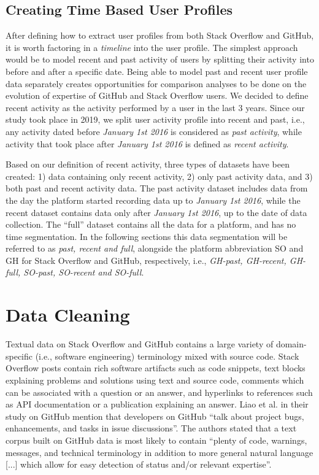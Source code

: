     \subsection{Creating Time Based User Profiles} \label{past_recent_full_segm}
        After defining how to extract user profiles from both Stack Overflow and GitHub, it is worth factoring in a \textit{timeline} into the user profile. The simplest approach would be to model recent and past activity of users by splitting their activity into before and after a specific date. Being able to model past and recent user profile data separately creates opportunities for comparison analyses to be done on the evolution of expertise of GitHub and Stack Overflow users. We decided to define recent activity as the activity performed by a user in the last 3 years. Since our study took place in 2019, we split user activity profile into recent and past, i.e., any activity dated before \textit{January 1st 2016} is considered as \textit{past activity}, while activity that took place after \textit{January 1st 2016} is defined as \textit{recent activity}. 
        
        Based on our definition of recent activity, three types of datasets have been created: 1) data containing only recent activity, 2) only past activity data, and 3) both past and recent activity data. The past activity dataset includes data from the day the platform started recording data up to \textit{January 1st 2016}, while the recent dataset contains data only after \textit{January 1st 2016}, up to the date of data collection. The ``full'' dataset contains all the data for a platform, and has no time segmentation. In the following sections this data segmentation will be referred to as \emph{past, recent and full}, alongside the platform abbreviation SO and GH for Stack Overflow and GitHub, respectively, i.e.,  \emph{GH-past, GH-recent, GH-full, SO-past, SO-recent and SO-full}.

\section{Data Cleaning}\label{sec:data_cleaning}

    Textual data on Stack Overflow and GitHub contains a large variety of domain-specific (i.e., software engineering) terminology mixed with source code. Stack Overflow posts contain rich software artifacts such as code snippets, text blocks explaining problems and solutions using text and source code, comments which can be associated with a question or an answer, and hyperlinks to references such as API documentation or a publication explaining an answer.  Liao et al. \cite{liao2019status} in their study on GitHub mention that developers on GitHub ``talk about project bugs, enhancements, and tasks in issue discussions''. The authors stated that a text corpus built on GitHub data is most likely  to contain ``plenty of code, warnings, messages, and technical terminology in addition to more general natural language [...] which allow for easy detection of status and/or relevant expertise''.
    
